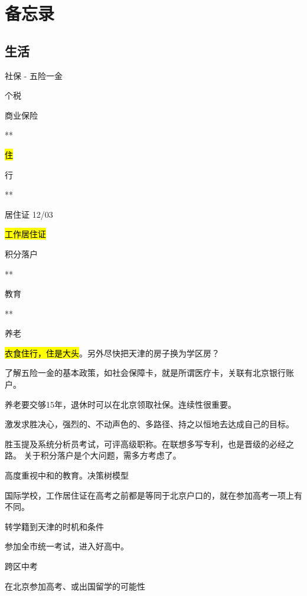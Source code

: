 \chapter{备忘录}

\section{生活}

\begin{enumbox}
\item 社保 - 五险一金
\item 个税
\item 商业保险
\item ***
\item \hl{住}
\item 行
\item ***
\item 居住证 12/03
\item \hl{工作居住证}
\item 积分落户
\item ***
\item 教育
\item ***
\item 养老
\end{enumbox}

\hl{衣食住行，住是大头}。另外尽快把天津的房子换为学区房？

了解五险一金的基本政策，如社会保障卡，就是所谓医疗卡，关联有北京银行账户。

养老要交够15年，退休时可以在北京领取社保。连续性很重要。

\hrulefill

激发求胜决心，强烈的、不动声色的、多路径、持之以恒地去达成自己的目标。

胜玉提及系统分析员考试，可评高级职称。在联想多写专利，也是晋级的必经之路。
关于积分落户是个大问题，需多方考虑了。

\hrulefill

高度重视中和的教育。决策树模型

国际学校，工作居住证在高考之前都是等同于北京户口的，就在参加高考一项上有不同。

转学籍到天津的时机和条件

参加全市统一考试，进入好高中。

跨区中考

在北京参加高考、或出国留学的可能性
